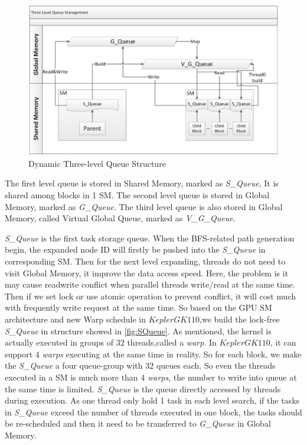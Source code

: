 \documentclass{llncs}
\begin{document}
\begin{figure}[htbp]
    \includegraphics[width=\textwidth]{DQM.eps}
    \caption{Dynamic Three-level Queue Structure}
    \label{fig:DQM}
\end{figure}

The first level queue is stored in Shared Memory, marked as \textsl{S\_Queue}, It is shared among blocks in 1 SM. The second level queue is stored in Global Memory, marked as \textsl{G\_Queue}. The third level queue is also stored in Global Memory, called Virtual Global Queue, marked as \textsl{V\_G\_Queue}.

\textsl{S\_Queue} is the first task storage queue. When the BFS-related path generation begin, the expanded node ID will firstly be pushed into the \textsl{S\_Queue} in corresponding SM. Then for the next level expanding, threads do not need to visit Global Memory, it improve the data access speed. Here, the problem is it may cause read\/write conflict when parallel threads write/read at the same time. Then if we set lock or use atomic operation to prevent conflict, it will cost much with frequently write request at the same time. So based on the GPU SM architecture and new Warp schedule in $Kepler GK110$,we build the lock-free \textsl{S\_Queue} in structure showed in \ref{fig:SQueue}. As mentioned, the kernel is actually executed in groups of $32$ threads,called a \textsl{warp}. In $Kepler GK110$, it can support $4$ \textsl{warps} executing at the same time in reality. So for each block, we make the \textsl{S\_Queue} a four queue-group with $32$ queues each. So even the threads executed in a SM is much more than 4 \textsl{warps}, the number to write into queue at the same time is limited. \textsl{S\_Queue} is the queue directly accessed by threads during execution. As one thread only hold 1 task in each level search, if the tasks in \textsl{S\_Queue} exceed the number of threads executed in one block, the tasks should be re-scheduled and then it need to be transferred to \textsl{G\_Queue} in Global Memory.
\end{document}
